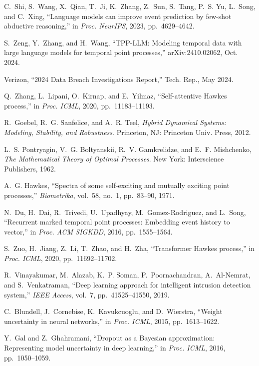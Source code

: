 \documentclass[10pt,journal,compsoc]{IEEEtran}
\begin{document}
\begin{thebibliography}{99}
C.~Shi, S.~Wang, X.~Qian, T.~Ji, K.~Zhang, Z.~Sun, S.~Tang, P.~S. Yu, L.~Song, and C.~Xing, ``Language models can improve event prediction by few-shot abductive reasoning,'' in \emph{Proc. NeurIPS}, 2023, pp.~4629--4642.

S.~Zeng, Y.~Zhang, and H.~Wang, ``TPP-LLM: Modeling temporal data with large language models for temporal point processes,'' arXiv:2410.02062, Oct. 2024.

Verizon, ``2024 Data Breach Investigations Report,'' Tech. Rep., May 2024.

Q.~Zhang, L.~Lipani, O.~Kirnap, and E.~Yilmaz, ``Self-attentive Hawkes process,'' in \emph{Proc. ICML}, 2020, pp.~11183--11193.

R.~Goebel, R.~G. Sanfelice, and A.~R. Teel, \emph{Hybrid Dynamical Systems: Modeling, Stability, and Robustness}. Princeton, NJ: Princeton Univ. Press, 2012.

L.~S. Pontryagin, V.~G. Boltyanskii, R.~V. Gamkrelidze, and E.~F. Mishchenko, \emph{The Mathematical Theory of Optimal Processes}. New York: Interscience Publishers, 1962.

A.~G. Hawkes, ``Spectra of some self-exciting and mutually exciting point processes,'' \emph{Biometrika}, vol.~58, no.~1, pp.~83--90, 1971.

N.~Du, H.~Dai, R.~Trivedi, U.~Upadhyay, M.~Gomez-Rodriguez, and L.~Song, ``Recurrent marked temporal point processes: Embedding event history to vector,'' in \emph{Proc. ACM SIGKDD}, 2016, pp.~1555--1564.

S.~Zuo, H.~Jiang, Z.~Li, T.~Zhao, and H.~Zha, ``Transformer Hawkes process,'' in \emph{Proc. ICML}, 2020, pp.~11692--11702.

R.~Vinayakumar, M.~Alazab, K.~P. Soman, P.~Poornachandran, A.~Al-Nemrat, and S.~Venkatraman, ``Deep learning approach for intelligent intrusion detection system,'' \emph{IEEE Access}, vol.~7, pp.~41525--41550, 2019.

C.~Blundell, J.~Cornebise, K.~Kavukcuoglu, and D.~Wierstra, ``Weight uncertainty in neural networks,'' in \emph{Proc. ICML}, 2015, pp.~1613--1622.

Y.~Gal and Z.~Ghahramani, ``Dropout as a Bayesian approximation: Representing model uncertainty in deep learning,'' in \emph{Proc. ICML}, 2016, pp.~1050--1059.


\end{thebibliography}
\end{document}
